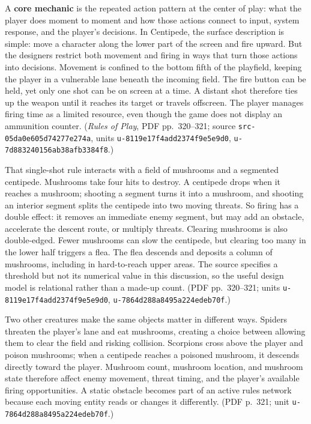 A \textbf{core mechanic} is the repeated action pattern at the center of play: what the player does moment to moment and how those actions connect to input, system response, and the player's decisions. In Centipede, the surface description is simple: move a character along the lower part of the screen and fire upward. But the designers restrict both movement and firing in ways that turn those actions into decisions. Movement is confined to the bottom fifth of the playfield, keeping the player in a vulnerable lane beneath the incoming field. The fire button can be held, yet only one shot can be on screen at a time. A distant shot therefore ties up the weapon until it reaches its target or travels offscreen. The player manages firing time as a limited resource, even though the game does not display an ammunition counter. (\emph{Rules of Play}, PDF pp.~320--321; source \texttt{src-05da0e605d74277e274a}, units \texttt{u-8119e17f4add2374f9e5e9d0}, \texttt{u-7d883240156ab38afb3384f8}.)

That single-shot rule interacts with a field of mushrooms and a segmented centipede. Mushrooms take four hits to destroy. A centipede drops when it reaches a mushroom; shooting a segment turns it into a mushroom, and shooting an interior segment splits the centipede into two moving threats. So firing has a double effect: it removes an immediate enemy segment, but may add an obstacle, accelerate the descent route, or multiply threats. Clearing mushrooms is also double-edged. Fewer mushrooms can slow the centipede, but clearing too many in the lower half triggers a flea. The flea descends and deposits a column of mushrooms, including in hard-to-reach upper areas. The source specifies a threshold but not its numerical value in this discussion, so the useful design model is relational rather than a made-up count. (PDF pp.~320--321; units \texttt{u-8119e17f4add2374f9e5e9d0}, \texttt{u-7864d288a8495a224edeb70f}.)

Two other creatures make the same objects matter in different ways. Spiders threaten the player's lane and eat mushrooms, creating a choice between allowing them to clear the field and risking collision. Scorpions cross above the player and poison mushrooms; when a centipede reaches a poisoned mushroom, it descends directly toward the player. Mushroom count, mushroom location, and mushroom state therefore affect enemy movement, threat timing, and the player's available firing opportunities. A static obstacle becomes part of an active rules network because each moving entity reads or changes it differently. (PDF p.~321; unit \texttt{u-7864d288a8495a224edeb70f}.)

